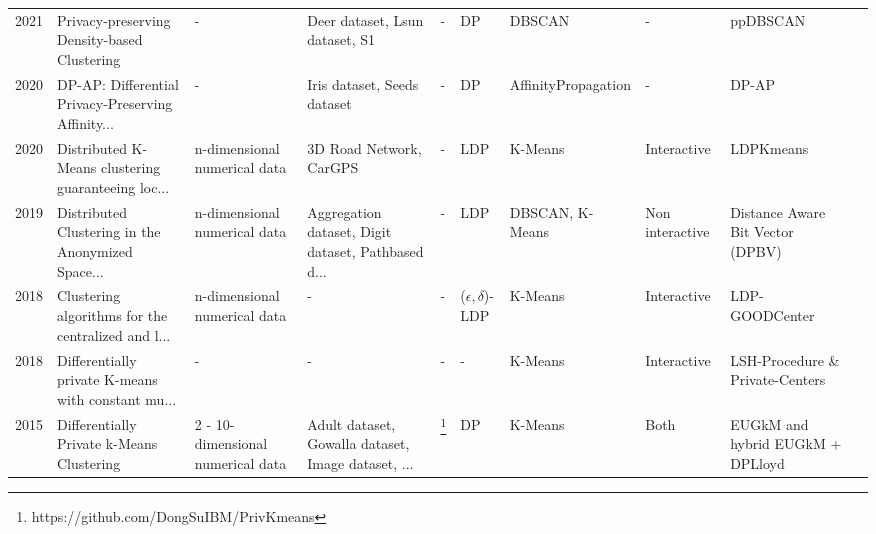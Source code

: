 \begin{landscape}
\begin{table}[ht]
\begin{adjustbox}{width=1.6\textwidth}
\begin{tabular}{rlllllllll}
        2021 \citep{bozdemir_privacy-preserving_nodate} & Privacy-preserving Density-based Clustering        & -                                 & Deer dataset, Lsun dataset, S1                     & -                                                  & DP                       & DBSCAN              & -               & ppDBSCAN                         \\
        2020 \citep{cai_dp-ap_2020}                     & DP-AP: Differential Privacy-Preserving Affinity... & -                                 & Iris dataset, Seeds dataset                        & -                                                  & DP                       & AffinityPropagation & -               & DP-AP                            \\
        2020 \citep{xia_distributed_2020}               & Distributed K-Means clustering guaranteeing loc... & n-dimensional numerical data      & 3D Road Network, CarGPS                            & -                                                  & LDP                      & K-Means             & Interactive     & LDPKmeans                        \\
        2019 \citep{sun_distributed_2019}               & Distributed Clustering in the Anonymized Space...  & n-dimensional numerical data      & Aggregation dataset, Digit dataset, Pathbased d... & -                                                  & LDP                      & DBSCAN, K-Means     & Non interactive & Distance Aware Bit Vector (DPBV) \\
        2018 \citep{nissim_clustering_2018}             & Clustering algorithms for the centralized and l... & n-dimensional numerical data      & -                                                  & -                                                  & ($\epsilon, \delta$)-LDP & K-Means             & Interactive     & LDP-GOODCenter                   \\
        2018 \citep{nissim_clustering_2018}             & Differentially private K-means with constant mu... & -                                 & -                                                  & -                                                  & -                        & K-Means             & Interactive     & LSH-Procedure \& Private-Centers \\
        2015 \citep{su_differentially_2015}             & Differentially Private k-Means Clustering          & 2 - 10-dimensional numerical data & Adult dataset, Gowalla dataset, Image dataset, ... & \footnote{https://github.com/DongSuIBM/PrivKmeans} & DP                       & K-Means             & Both            & EUGkM and hybrid EUGkM + DPLloyd \\

\end{tabular}
\end{adjustbox}
\end{table}
\end{landscape}
